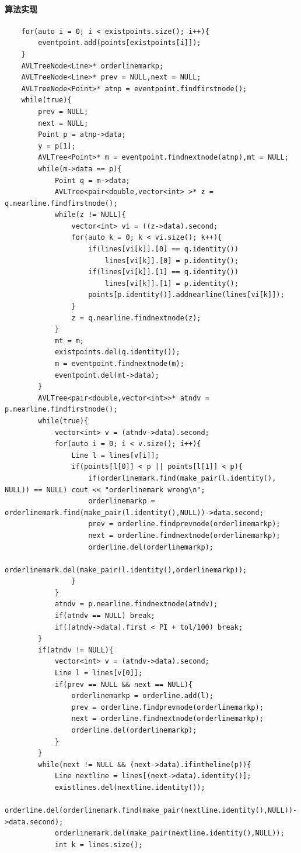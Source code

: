 \documentclass[a4paper]{book}
\numberwithin{equation}{chapter}
\theoremstyle{definition}
\begin{document}
\paragraph{算法实现}
\begin{lstlisting}
	for(auto i = 0; i < existpoints.size(); i++){
		eventpoint.add(points[existpoints[i]]);
	}
	AVLTreeNode<Line>* orderlinemarkp;
	AVLTreeNode<Line>* prev = NULL,next = NULL;
	AVLTreeNode<Point>* atnp = eventpoint.findfirstnode();
	while(true){
		prev = NULL;
		next = NULL;
		Point p = atnp->data;
		y = p[1];
		AVLTree<Point>* m = eventpoint.findnextnode(atnp),mt = NULL;
		while(m->data == p){
			Point q = m->data;
			AVLTree<pair<double,vector<int> >* z = q.nearline.findfirstnode();
			while(z != NULL){
				vector<int> vi = ((z->data).second;
				for(auto k = 0; k < vi.size(); k++){
					if(lines[vi[k]].[0] == q.identity()) 
						lines[vi[k]].[0] = p.identity();
					if(lines[vi[k]].[1] == q.identity()) 
						lines[vi[k]].[1] = p.identity();
					points[p.identity()].addnearline(lines[vi[k]]); 
				}
				z = q.nearline.findnextnode(z);	
			}
			mt = m;
			existpoints.del(q.identity());
			m = eventpoint.findnextnode(m);
			eventpoint.del(mt->data);
		} 
		AVLTree<pair<double,vector<int>>* atndv = p.nearline.findfirstnode();
		while(true){
			vector<int> v = (atndv->data).second;
			for(auto i = 0; i < v.size(); i++){
				Line l = lines[v[i]];
				if(points[l[0]] < p || points[l[1]] < p){
					if(orderlinemark.find(make_pair(l.identity(), NULL)) == NULL) cout << "orderlinemark wrong\n";
					orderlinemarkp = orderlinemark.find(make_pair(l.identity(),NULL))->data.second;
					prev = orderline.findprevnode(orderlinemarkp);
					next = orderline.findnextnode(orderlinemarkp);
					orderline.del(orderlinemarkp);
					orderlinemark.del(make_pair(l.identity(),orderlinemarkp));
				}
			}	
			atndv = p.nearline.findnextnode(atndv);	
			if(atndv == NULL) break;
			if((atndv->data).first < PI + tol/100) break;	
		}
		if(atndv != NULL){
			vector<int> v = (atndv->data).second;
			Line l = lines[v[0]];
			if(prev == NULL && next == NULL){
				orderlinemarkp = orderline.add(l);
				prev = orderline.findprevnode(orderlinemarkp);
				next = orderline.findnextnode(orderlinemarkp);
				orderline.del(orderlinemarkp);
			}
		}
		while(next != NULL && (next->data).ifintheline(p)){
			Line nextline = lines[(next->data).identity()];
			existlines.del(nextline.identity());
			orderline.del(orderlinemark.find(make_pair(nextline.identity(),NULL))->data.second);
			orderlinemark.del(make_pair(nextline.identity(),NULL));
			int k = lines.size();

\end{lstlisting}
\end{document}
